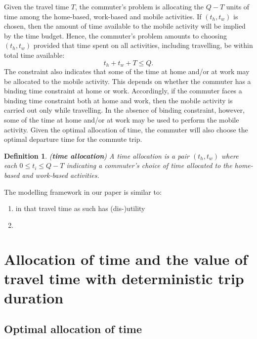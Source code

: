\documentclass[12pt,a4paper,british]{article}
\newtheorem{definition}{Definition}[section]
\begin{document}
Given the travel time $T$, the commuter's problem is allocating the $Q-T$ units of time among the home-based, work-based and mobile activities. If $\left(t_{h},t_{w}\right)$ is chosen, then the amount of time available to the mobile activity will be implied by the time budget. Hence, the commuter's problem amounts to choosing $\left(t_{h},t_{w}\right)$ provided that time spent on all activities, including travelling, be within total time available:  
\begin{equation}
t_{h}+t_{w}+T\leq Q.
\label{constraint0}
\end{equation}
The constraint also indicates that some of the time at home and/or at work may be allocated to the mobile activity. This depends on whether the commuter has a binding time constraint at home or work. Accordingly, if the commuter faces a binding time constraint both at home and work, then the mobile activity is carried out only while travelling. In the absence of binding constraint, however, some of the time at home and/or at work may be used to perform the mobile activity. Given the optimal allocation of time, the commuter will also choose the optimal departure time for the commute trip.


\begin{definition}
(\textbf{time allocation}) A time allocation is a pair $\left(t_{h},t_{w}\right)$ where each $0\leq t_{i}\leq Q-T$ indicating a commuter's choice of time allocated to the home-based and work-based activities.
\end{definition}

The modelling framework in our paper is similar to:
\begin{enumerate}
    \item \citeauthor{Oort1969EvaluationTravellingTime} in that travel time as such has (dis-)utility
    \item \citet{DeSerpa1971TheoryEconomicsTime}
\end{enumerate}

\section{Allocation of time and the value of travel time with deterministic trip duration}

\subsection*{Optimal allocation of time}
\end{document}
